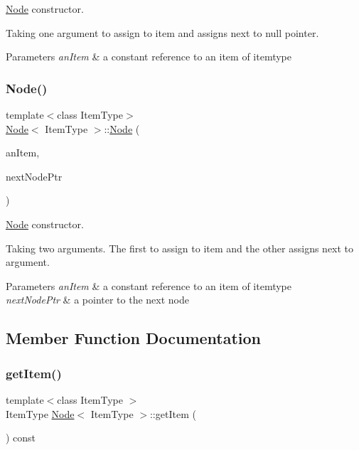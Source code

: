 \hyperlink{classNode}{Node} constructor. 

Taking one argument to assign to item and assigns next to null pointer. 
\begin{DoxyParams}{Parameters}
{\em an\+Item} & a constant reference to an item of itemtype \\
\hline
\end{DoxyParams}
\mbox{\label{classNode_adf98d3f9b7227622cb5a0fdd7e8f0b18}} 
\subsubsection{\texorpdfstring{Node()}{Node()}\hspace{0.1cm}{\footnotesize\ttfamily [3/3]}}
{\footnotesize\ttfamily template$<$class Item\+Type$>$ \\
\hyperlink{classNode}{Node}$<$ Item\+Type $>$\+::\hyperlink{classNode}{Node} (\begin{DoxyParamCaption}\item[{const Item\+Type \&}]{an\+Item,  }\item[{\hyperlink{classNode}{Node}$<$ Item\+Type $>$ $\ast$}]{next\+Node\+Ptr }\end{DoxyParamCaption})}



\hyperlink{classNode}{Node} constructor. 

Taking two arguments. The first to assign to item and the other assigns next to argument. 
\begin{DoxyParams}{Parameters}
{\em an\+Item} & a constant reference to an item of itemtype \\
\hline
{\em next\+Node\+Ptr} & a pointer to the next node \\
\hline
\end{DoxyParams}


\subsection{Member Function Documentation}
\mbox{\label{classNode_a6c08caef312b6f2f69b5e090cf047514}} 
\subsubsection{\texorpdfstring{get\+Item()}{getItem()}}
{\footnotesize\ttfamily template$<$class Item\+Type $>$ \\
Item\+Type \hyperlink{classNode}{Node}$<$ Item\+Type $>$\+::get\+Item (\begin{DoxyParamCaption}{ }\end{DoxyParamCaption}) const}



